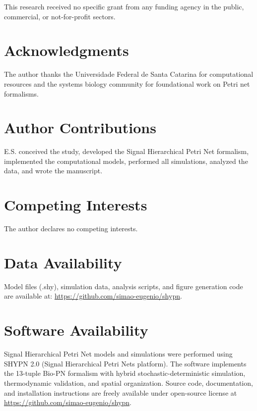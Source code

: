 \documentclass[twocolumn,11pt]{article}
\begin{document}
This research received no specific grant from any funding agency in the public, commercial, or not-for-profit sectors.

\section*{Acknowledgments}

The author thanks the Universidade Federal de Santa Catarina for computational resources and the systems biology community for foundational work on Petri net formalisms.

\section*{Author Contributions}

E.S. conceived the study, developed the Signal Hierarchical Petri Net formalism, implemented the computational models, performed all simulations, analyzed the data, and wrote the manuscript.

\section*{Competing Interests}

The author declares no competing interests.

\section*{Data Availability}

Model files (.shy), simulation data, analysis scripts, and figure generation code are available at: \url{https://github.com/simao-eugenio/shypn}.

\section*{Software Availability}

Signal Hierarchical Petri Net models and simulations were performed using SHYPN 2.0 (Signal Hierarchical Petri Nets platform). The software implements the 13-tuple Bio-PN formalism with hybrid stochastic-deterministic simulation, thermodynamic validation, and spatial organization. Source code, documentation, and installation instructions are freely available under open-source license at \url{https://github.com/simao-eugenio/shypn}.
\end{document}

